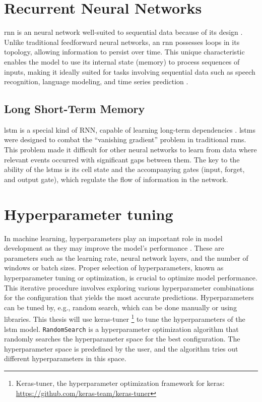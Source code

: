 \section{Recurrent Neural Networks}

\ac{rnn} is an neural network well-suited to sequential data because of its design \cite{hopfield-rnn}.
Unlike traditional feedforward neural networks, an \ac{rnn} possesses loops in its topology, allowing information to persist over time.
This unique characteristic enables the model to use its internal state (memory) to process sequences of inputs, making it ideally suited for tasks involving sequential data such as speech recognition, language modeling, and time series prediction \cite{elman_finding_1990}.

\subsection{Long Short-Term Memory}

\ac{lstm} is a special kind of RNN, capable of learning long-term dependencies \cite{lstm-hochreiter}.
\acp{lstm} were designed to combat the ``vanishing gradient'' problem in traditional \acp{rnn}. 
This problem made it difficult for other neural networks to learn from data where relevant events occurred with significant gaps between them.
The key to the ability of the \acp{lstm} is its cell state and the accompanying gates (input, forget, and output gate), which regulate the flow of information in the network.

\section{Hyperparameter tuning}\label{sec:hyperparameter-tuning}

In machine learning, hyperparameters play an important role in model development as they may improve the model's performance \cite{yuHyperParameterOptimizationReview2020}.
These are parameters such as the learning rate, neural network layers, and the number of windows or batch sizes.
Proper selection of hyperparameters, known as hyperparameter tuning or optimization, is crucial to optimize model performance.
This iterative procedure involves exploring various hyperparameter combinations for the configuration that yields the most accurate predictions.
Hyperparameters can be tuned by, e.g., random search, which can be done manually or using libraries.
This thesis will use keras-tuner \footnote{Keras-tuner, the hyperparameter optimization framework for keras: \url{https://github.com/keras-team/keras-tuner}} to tune the hyperparameters of the \ac{lstm} model.
\texttt{RandomSearch} is a hyperparameter optimization algorithm that randomly searches the hyperparameter space for the best configuration.
The hyperparameter space is predefined by the user, and the algorithm tries out different hyperparameters in this space.


